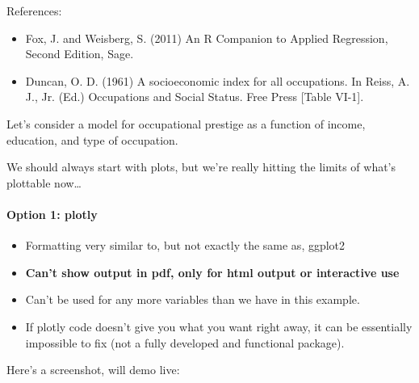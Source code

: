 \documentclass[]{extarticle}
\newenvironment{Shaded}{\begin{snugshade}}{\end{snugshade}}
\newcommand{\KeywordTok}[1]{\textcolor[rgb]{0.13,0.29,0.53}{\textbf{#1}}}
\newcommand{\DataTypeTok}[1]{\textcolor[rgb]{0.13,0.29,0.53}{#1}}
\newcommand{\StringTok}[1]{\textcolor[rgb]{0.31,0.60,0.02}{#1}}
\newcommand{\OperatorTok}[1]{\textcolor[rgb]{0.81,0.36,0.00}{\textbf{#1}}}
\newcommand{\NormalTok}[1]{#1}
\providecommand{\tightlist}{%
  \setlength{\itemsep}{0pt}\setlength{\parskip}{0pt}}
\let\oldparagraph\paragraph
\renewcommand{\paragraph}[1]{\oldparagraph{#1}\mbox{}}
\begin{document}
References:

\begin{itemize}
\tightlist
\item
  Fox, J. and Weisberg, S. (2011) An R Companion to Applied Regression,
  Second Edition, Sage.
\item
  Duncan, O. D. (1961) A socioeconomic index for all occupations. In
  Reiss, A. J., Jr. (Ed.) Occupations and Social Status. Free Press
  {[}Table VI-1{]}.
\end{itemize}

Let's consider a model for occupational prestige as a function of
income, education, and type of occupation.

We should always start with plots, but we're really hitting the limits
of what's plottable now\ldots{}

\newpage

\paragraph{Option 1: plotly}\label{option-1-plotly}

\begin{itemize}
\tightlist
\item
  Formatting very similar to, but not exactly the same as, ggplot2
\item
  \textbf{Can't show output in pdf, only for html output or interactive
  use}
\item
  Can't be used for any more variables than we have in this example.
\item
  If plotly code doesn't give you what you want right away, it can be
  essentially impossible to fix (not a fully developed and functional
  package).
\end{itemize}

\begin{Shaded}
\end{Shaded}

Here's a screenshot, will demo live:
\end{document}
